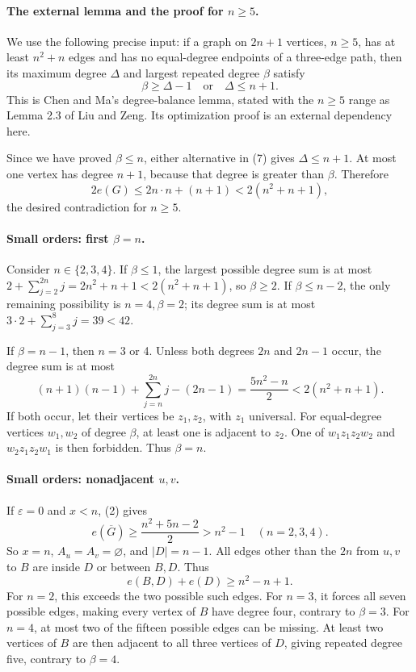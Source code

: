 \paragraph{The external lemma and the proof for \(n\geq5\).}
We use the following precise input: if a graph on \(2n+1\) vertices, \(n\geq5\), has at least \(n^2+n\) edges and has no equal-degree endpoints of a three-edge path, then its maximum degree \(\Delta\) and largest repeated degree \(\beta\) satisfy
\[
 \beta\geq\Delta-1\quad\text{or}\quad\Delta\leq n+1.
\tag{7}
\]
This is Chen and Ma's degree-balance lemma, stated with the \(n\geq5\) range as Lemma 2.3 of Liu and Zeng. Its optimization proof is an external dependency here.

Since we have proved \(\beta\leq n\), either alternative in (7) gives \(\Delta\leq n+1\). At most one vertex has degree \(n+1\), because that degree is greater than \(\beta\). Therefore
\[
 2e(G)\leq2n\cdot n+(n+1)<2(n^2+n+1),
\]
the desired contradiction for \(n\geq5\).

\paragraph{Small orders: first \(\beta=n\).}
Consider \(n\in\{2,3,4\}\). If \(\beta\leq1\), the largest possible degree sum is at most
\(2+\sum_{j=2}^{2n}j=2n^2+n+1<2(n^2+n+1)\), so \(\beta\geq2\). If \(\beta\leq n-2\), the only remaining possibility is \(n=4,\beta=2\); its degree sum is at most \(3\cdot2+\sum_{j=3}^{8}j=39<42\).

If \(\beta=n-1\), then \(n=3\) or 4. Unless both degrees \(2n\) and \(2n-1\) occur, the degree sum is at most
\[
 (n+1)(n-1)+\sum_{j=n}^{2n}j-(2n-1)
 =\frac{5n^2-n}{2}<2(n^2+n+1).
\]
If both occur, let their vertices be \(z_1,z_2\), with \(z_1\) universal. For equal-degree vertices \(w_1,w_2\) of degree \(\beta\), at least one is adjacent to \(z_2\). One of \(w_1z_1z_2w_2\) and \(w_2z_1z_2w_1\) is then forbidden. Thus \(\beta=n\).

\paragraph{Small orders: nonadjacent \(u,v\).}
If \(\varepsilon=0\) and \(x<n\), (2) gives
\[
 e(\overline G)\geq\frac{n^2+5n-2}{2}>n^2-1
 \quad(n=2,3,4).
\]
So \(x=n\), \(A_u=A_v=\varnothing\), and \(|D|=n-1\). All edges other than the \(2n\) from \(u,v\) to \(B\) are inside \(D\) or between \(B,D\). Thus
\[
 e(B,D)+e(D)\geq n^2-n+1.
\tag{8}
\]
For \(n=2\), this exceeds the two possible such edges. For \(n=3\), it forces all seven possible edges, making every vertex of \(B\) have degree four, contrary to \(\beta=3\). For \(n=4\), at most two of the fifteen possible edges can be missing. At least two vertices of \(B\) are then adjacent to all three vertices of \(D\), giving repeated degree five, contrary to \(\beta=4\).

